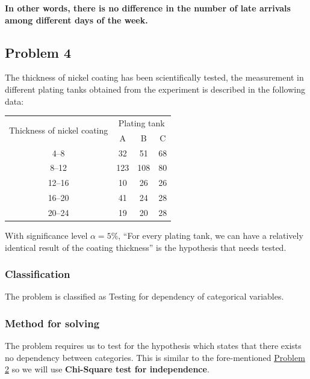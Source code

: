 \documentclass[a4paper]{article}
\numberwithin{equation}{section}
\begin{document}
\textbf{In other words, there is no difference in the number of late arrivals among different days of the week.}

\newpage
\subsection{Problem 4}
The thickness of nickel coating has been scientifically tested, the measurement in different plating tanks obtained from the experiment is described in the following data:
\begin{center}
  \begin{tabular}{cccc}
    \toprule
    \multirow{2}{*}{Thickness of nickel coating} & \multicolumn{3}{c}{Plating tank}            \\
    \cmidrule(lr){2-4}
                                                 & A                                & B   & C  \\
    \midrule
    4--8                                         & 32                               & 51  & 68 \\
    8--12                                        & 123                              & 108 & 80 \\
    12--16                                       & 10                               & 26  & 26 \\
    16--20                                       & 41                               & 24  & 28 \\
    20--24                                       & 19                               & 20  & 28 \\
    \bottomrule
  \end{tabular}
\end{center}

With significance level \( \alpha = 5\% \), ``For every plating tank, we can have a relatively identical result of the coating thickness'' is the hypothesis that needs tested.

\subsubsection{Classification}
The problem is classified as Testing for dependency of categorical variables.

\subsubsection{Method for solving}
The problem requires us to test for the hypothesis which states that there exists no dependency between categories. This is similar to the fore-mentioned \hyperref[p2]{\underline{Problem 2}} so we will use \textbf{Chi-Square test for independence}.
\end{document}
